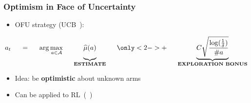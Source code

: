 \documentclass[aspectratio=169, table]{beamer}
\newcommand{\enb}[1]{\textcolor{poliblue1}{\textbf{#1}}}
\begin{document}
\begin{frame}
\frametitle{Optimism in Face of Uncertainty}
\begin{itemize}
	\item<2-> OFU strategy (\eg UCB~\cite{lai1985asymptotically}):
\end{itemize}
	\[
	a_t\hspace{.5cm} =\hspace{.5cm} \arg\max_{a\in\Aspace}\hspace{.5cm} \underbrace{\vphantom{C\sqrt{\frac{\log(\frac{1}{\delta})}{\#a}}}\widehat{\mu}(a)}_{\textbf{ESTIMATE}} \hspace{.5cm}
	\only<2->{+\hspace{.5cm} \underbrace{C\sqrt{\frac{\log(\frac{1}{\delta})}{\#a}}}_{\textbf{EXPLORATION BONUS}}}
	\]
\begin{itemize}
	\item<3-> Idea: be \enb{optimistic} about unknown arms
	\item<4-> Can be applied to RL~(\eg~\cite{jaksch2010near})
\end{itemize}
\end{frame}
\end{document}

